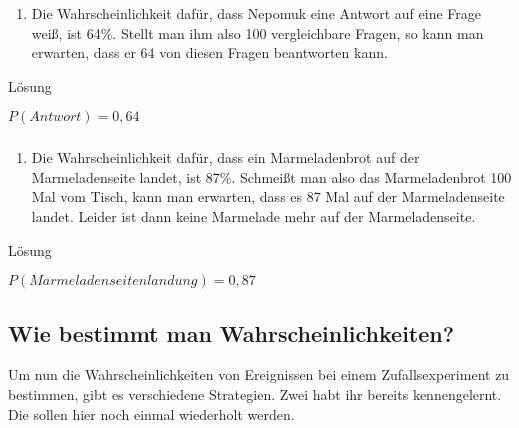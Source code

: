 \documentclass[
  ngerman,
]{book}
\providecommand{\tightlist}{%
  \setlength{\itemsep}{0pt}\setlength{\parskip}{0pt}}
\begin{document}
\begin{enumerate}
\def\labelenumi{\alph{enumi})}
\tightlist
\item
  Die Wahrscheinlichkeit dafür, dass Nepomuk eine Antwort auf eine Frage weiß, ist 64\%. Stellt man ihm also 100 vergleichbare Fragen, so kann man erwarten, dass er 64 von diesen Fragen beantworten kann.
\end{enumerate}

Lösung

\(P(Antwort)=0,64\)

\hypertarget{section-69}{%
\subsubsection*{}\label{section-69}}

\begin{enumerate}
\def\labelenumi{\alph{enumi})}
\setcounter{enumi}{1}
\tightlist
\item
  Die Wahrscheinlichkeit dafür, dass ein Marmeladenbrot auf der Marmeladenseite landet, ist 87\%. Schmeißt man also das Marmeladenbrot 100 Mal vom Tisch, kann man erwarten, dass es 87 Mal auf der Marmeladenseite landet. Leider ist dann keine Marmelade mehr auf der Marmeladenseite.
\end{enumerate}

Lösung

\(P(Marmeladenseitenlandung)=0,87\)

\hypertarget{section-70}{%
\subsubsection*{}\label{section-70}}

\hypertarget{section-71}{%
\subsubsection*{}\label{section-71}}

\hypertarget{wie-bestimmt-man-wahrscheinlichkeiten}{%
\subsection*{Wie bestimmt man Wahrscheinlichkeiten?}\label{wie-bestimmt-man-wahrscheinlichkeiten}}

Um nun die Wahrscheinlichkeiten von Ereignissen bei einem Zufallsexperiment zu bestimmen, gibt es verschiedene Strategien. Zwei habt ihr bereits kennengelernt. Die sollen hier noch einmal wiederholt werden.
\end{document}
